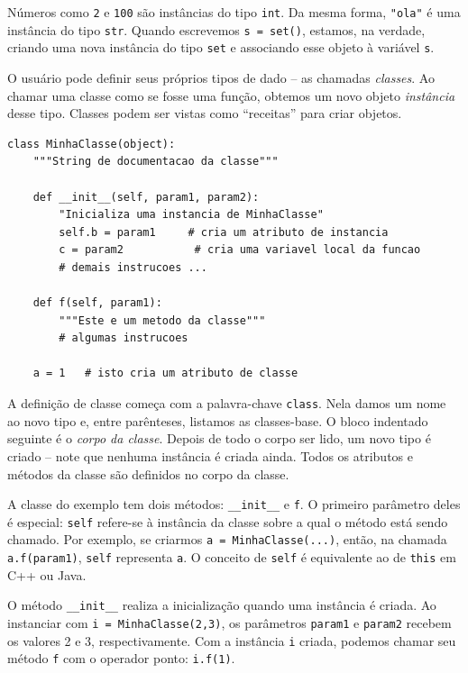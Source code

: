 \documentclass[11pt,a4paper]{article}
\begin{document}
Números como \texttt{2} e \texttt{100} são instâncias do tipo
\texttt{int}. Da mesma forma, \texttt{"ola"} é uma instância do tipo
\texttt{str}. Quando escrevemos \texttt{s = set()}, estamos, na verdade,
criando uma nova instância do tipo \texttt{set} e associando esse objeto
à variável \texttt{s}.

O usuário pode definir seus próprios tipos de dado -- as chamadas
\emph{classes}. Ao chamar uma classe como se fosse uma função, obtemos um
novo objeto \emph{instância} desse tipo. Classes podem ser vistas como
``receitas'' para criar objetos.

\begin{lstlisting}
class MinhaClasse(object):
    """String de documentacao da classe"""

    def __init__(self, param1, param2):
        "Inicializa uma instancia de MinhaClasse"
        self.b = param1     # cria um atributo de instancia
        c = param2           # cria uma variavel local da funcao
        # demais instrucoes ...

    def f(self, param1):
        """Este e um metodo da classe"""
        # algumas instrucoes

    a = 1   # isto cria um atributo de classe
\end{lstlisting}

A definição de classe começa com a palavra-chave \texttt{class}. Nela
damos um nome ao novo tipo e, entre parênteses, listamos as classes-base.
O bloco indentado seguinte é o \emph{corpo da classe}. Depois de todo o
corpo ser lido, um novo tipo é criado -- note que nenhuma instância é
criada ainda. Todos os atributos e métodos da classe são definidos no
corpo da classe.

A classe do exemplo tem dois métodos: \texttt{\_\_init\_\_} e \texttt{f}.
O primeiro parâmetro deles é especial: \texttt{self} refere-se à
instância da classe sobre a qual o método está sendo chamado. Por
exemplo, se criarmos \texttt{a = MinhaClasse(...)}, então, na chamada
\texttt{a.f(param1)}, \texttt{self} representa \texttt{a}. O conceito de
\texttt{self} é equivalente ao de \texttt{this} em C++ ou Java.

O método \texttt{\_\_init\_\_} realiza a inicialização quando uma
instância é criada. Ao instanciar com \texttt{i = MinhaClasse(2,3)}, os
parâmetros \texttt{param1} e \texttt{param2} recebem os valores 2 e 3,
respectivamente. Com a instância \texttt{i} criada, podemos chamar seu
método \texttt{f} com o operador ponto: \texttt{i.f(1)}.
\end{document}
